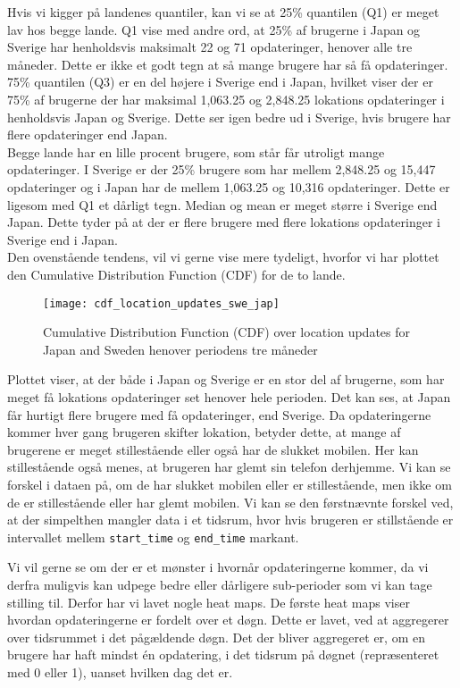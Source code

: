 Hvis vi kigger på landenes quantiler, kan vi se at 25\% quantilen (Q1) er meget lav hos begge lande. Q1 vise med andre ord, at 25\% af brugerne i Japan og Sverige har henholdsvis maksimalt 22 og 71 opdateringer, henover alle tre måneder. Dette er ikke et godt tegn at så mange brugere har så få opdateringer. 75\% quantilen (Q3) er en del højere i Sverige end i Japan, hvilket viser der er 75\% af brugerne der har maksimal 1,063.25 og 2,848.25 lokations opdateringer i henholdsvis Japan og Sverige. Dette ser igen bedre ud i Sverige, hvis brugere har flere opdateringer end Japan. \\ 

Begge lande har en lille procent brugere, som står får utroligt mange opdateringer. I Sverige er der 25\% brugere som har mellem 2,848.25 og 15,447 opdateringer og i Japan har de mellem 1,063.25 og 10,316 opdateringer. Dette er ligesom med Q1 et dårligt tegn. 
Median og mean er meget større i Sverige end Japan. Dette tyder på at der er flere brugere med flere lokations opdateringer i Sverige end i Japan. \\


Den ovenstående tendens, vil vi gerne vise mere tydeligt, hvorfor vi har plottet den Cumulative Distribution Function (CDF) for de to lande. 
\begin{figure}[H]
    \hspace*{-1.0cm}
    \centering
    \texttt{[image: cdf\_location\_updates\_swe\_jap]}
    \caption{Cumulative Distribution Function (CDF) over location updates for Japan and Sweden henover periodens tre måneder}
    \label{fig:country_cdf}
\end{figure}

Plottet viser, at der både i Japan og Sverige er en stor del af brugerne, som har meget få lokations opdateringer set henover hele perioden. Det kan ses, at Japan får hurtigt flere brugere med få opdateringer, end Sverige. 
Da opdateringerne kommer hver gang brugeren skifter lokation, betyder dette, at mange af brugerene er meget stillestående eller også har de slukket mobilen. Her kan stillestående også menes, at brugeren har glemt sin telefon derhjemme. Vi kan se forskel i dataen på, om de har slukket mobilen eller er stillestående, men ikke om de er stillestående eller har glemt mobilen. Vi kan se den førstnævnte forskel ved, at der simpelthen mangler data i et tidsrum, hvor hvis brugeren er stillstående er intervallet mellem \texttt{start\_time} og \texttt{end\_time} markant. 

Vi vil gerne se om der er et mønster i hvornår opdateringerne kommer, da vi derfra muligvis kan udpege bedre eller dårligere sub-perioder som vi kan tage stilling til. Derfor har vi lavet nogle heat maps. 
De første heat maps viser hvordan opdateringerne er fordelt over et døgn. Dette er lavet, ved at aggregerer over tidsrummet i det pågældende døgn. Det der bliver aggregeret er, om en brugere har haft mindst én opdatering, i det tidsrum på døgnet (repræsenteret med 0 eller 1), uanset hvilken dag det er.

